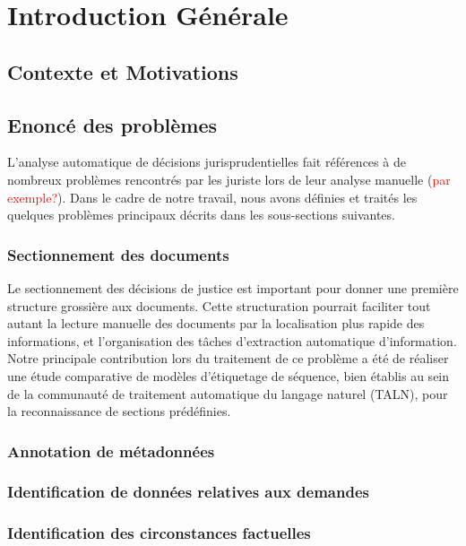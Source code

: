%
\chapter*{Introduction Générale}
\label{sec:intro}

\section{Contexte et Motivations}
\label{sec:intro:contexte}

\section{Enoncé des problèmes}
\label{sec:intro:probleme}
L'analyse automatique de décisions jurisprudentielles fait références à de nombreux problèmes rencontrés par les juriste lors de leur analyse manuelle (\textcolor{red}{par exemple?}). Dans le cadre de notre travail, nous avons définies et traités les quelques problèmes principaux décrits dans les sous-sections suivantes.
\subsection{Sectionnement des documents}
Le sectionnement des décisions de justice est important pour donner une première structure grossière aux documents. Cette structuration pourrait faciliter tout autant la lecture manuelle des documents par la localisation plus rapide des informations, et l'organisation des tâches d'extraction automatique d'information. Notre principale contribution lors du traitement de ce problème a été de réaliser une étude comparative de modèles d'étiquetage de séquence, bien établis au sein de la communauté de traitement automatique du langage naturel (TALN),  pour la reconnaissance de sections prédéfinies. 

\subsection{Annotation de métadonnées}

\subsection{Identification de données relatives aux demandes}

\subsection{Identification des circonstances factuelles}

